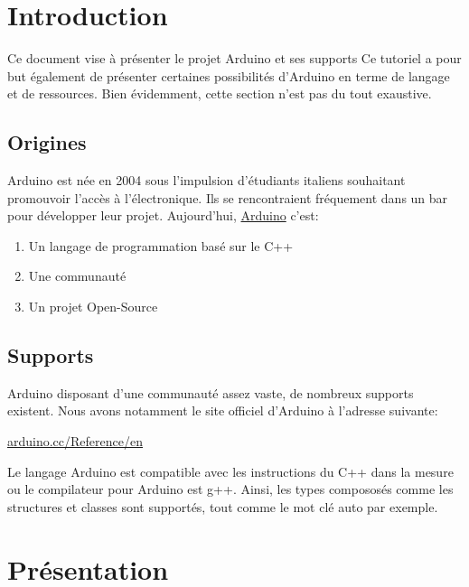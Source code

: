 \chapter{Introduction}

Ce document vise à présenter le projet Arduino et ses supports\newline
Ce tutoriel a pour but également de présenter certaines possibilités d'Arduino en terme de langage et de ressources. \newline
Bien évidemment, cette section n'est pas du tout exaustive.

\section{Origines}

Arduino est née en 2004 sous l'impulsion d'étudiants italiens souhaitant promouvoir l'accès à  l'électronique. Ils se rencontraient fréquement dans un bar pour développer leur projet. \newline
Aujourd'hui, \underline{Arduino} c'est:
\begin{enumerate}
\item Un langage de programmation basé sur le C++
\item Une communauté
\item Un projet Open-Source
\end{enumerate}

\section{Supports}

Arduino disposant d'une communauté assez vaste, de nombreux supports existent. \newline
Nous avons notamment le site officiel d'Arduino à l'adresse suivante:

\underline{arduino.cc/Reference/en} \newline

Le langage Arduino est compatible avec les instructions du C++ dans la mesure ou le compilateur pour Arduino est g++.
Ainsi, les types compososés comme les structures et classes sont supportés, tout comme le mot clé auto par exemple.


\chapter{Présentation}

